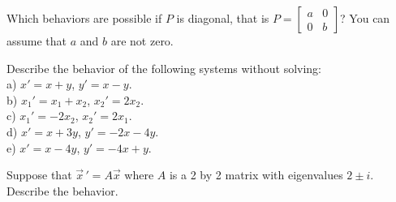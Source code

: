\documentclass[12pt]{book}
\begin{document}
\begin{exercise}
Which behaviors are possible if $P$ is diagonal, that is
$P = \left[ \begin{smallmatrix} a & 0 \\ 0 & b \end{smallmatrix} \right]$?
You can assume that $a$ and $b$ are not zero.
\end{exercise}

\setcounter{exercise}{100}

\begin{exercise}
Describe the behavior of the following systems without solving:\\
a) $x' = x + y$, \quad $y' = x-y$.\\
b) $x_1' = x_1 + x_2$, \quad $x_2' = 2 x_2$.\\
c) $x_1' = -2x_2$, \quad $x_2' = 2 x_1$.\\
d) $x' = x + 3y$, \quad $y' = -2x-4y$.\\
e) $x' = x - 4y$, \quad $y' = -4x+y$.
\end{exercise}

\begin{exercise}
Suppose that $\vec{x}\,' = A \vec{x}$ where $A$ is a 2 by 2 matrix
with eigenvalues $2\pm i$.  Describe the behavior.
\end{exercise}
\end{document}
